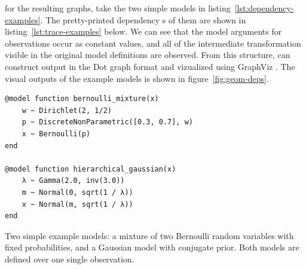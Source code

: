  for the resulting graphs, take the two simple models in
listing~\ref{lst:dependency-examples}.  The pretty-printed dependency s of them are
shown in listing~\ref{lst:trace-examples} below.  We can see that the model arguments for
observations occur as constant values, and all of the intermediate transformation visible in the
original model definitions are observed.  From this structure, \autogibbsjl{} can construct output
in the Dot graph format and vizualized using GraphViz \parencite{gansner2000open}.  The visual
outputs of the example models is shown in figure~\ref{fig:geom-deps}.

\begin{lstfloat}[p]
\begin{lstlisting}[style=lstfloat]
@model function bernoulli_mixture(x)
    w ~ Dirichlet(2, 1/2)
    p ~ DiscreteNonParametric([0.3, 0.7], w)
    x ~ Bernoulli(p)
end

@model function hierarchical_gaussian(x)
    λ ~ Gamma(2.0, inv(3.0))
    m ~ Normal(0, sqrt(1 / λ))
    x ~ Normal(m, sqrt(1 / λ))
end
\end{lstlisting}
  \caption{Two simple example models: a mixture of two Bernoulli random variables with fixed
    probabilities, and a Gaussian model with conjugate prior.  Both models are defined over one
    single observation.}
  \label{lst:dependency-examples}
\end{lstfloat}

